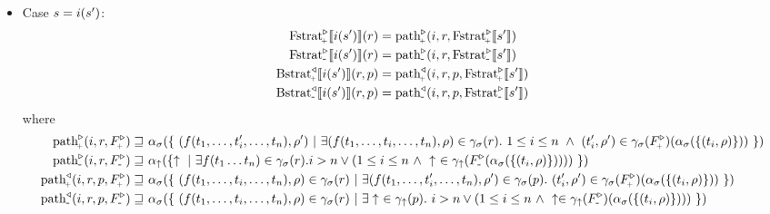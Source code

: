 \documentclass{article}
\newcommand{\minus}{{\scalebox{0.9}{-}}}
\newcommand{\plus}{{\scalebox{0.6}{\!+}}}
\newcommand{\fail}{\ensuremath \uparrow}
\newcommand{\path}[2]{\ensuremath #1(#2)}
\newcommand{\Fstratam}[1]{\ensuremath \text{Fstrat}^\triangleright_\minus \llbracket #1 \rrbracket}
\newcommand{\Fstratap}[1]{\ensuremath \text{Fstrat}^\triangleright_\plus \llbracket #1 \rrbracket}
\newcommand{\Bstratap}[1]{\ensuremath \text{Bstrat}_\plus^\triangleleft \llbracket #1 \rrbracket}
\newcommand{\Bstratam}[1]{\ensuremath \text{Bstrat}_\minus^\triangleleft \llbracket #1 \rrbracket}
\newcommand{\fpathp}{\ensuremath \text{path}^\triangleright_\plus}
\newcommand{\fpathm}{\ensuremath \text{path}^\triangleright_\minus}
\newcommand{\bpathp}{\ensuremath \text{path}^\triangleleft_\plus}
\newcommand{\bpathm}{\ensuremath \text{path}^\triangleleft_\minus}
\newcommand{\absstate}{\ensuremath \alpha_\sigma }
\newcommand{\constate}{\ensuremath \gamma_\sigma }
\newcommand{\absfail}{\ensuremath \alpha_\fail }
\newcommand{\confail}{\ensuremath \gamma_\fail }
\begin{document}
\begin{itemize}
\item Case $s = \path{i}{s'}$:
  \begin{align*}
    \Fstratap{\path{i}{s'}}(r) &= \fpathp(i,r,\Fstratap{s'}) \\
    \Fstratam{\path{i}{s'}}(r) &= \fpathm(i,r,\Fstratam{s'}) \\
    \Bstratap{\path{i}{s'}}(r,p) &= \bpathp(i,r,p,\Fstratap{s'}) \\
    \Bstratam{\path{i}{s'}}(r,p) &= \bpathm(i,r,p,\Fstratam{s'})
  \end{align*}
  where
  \begin{align*}
    \fpathp(i,r,F^\triangleright_\plus) \sqsupseteq\ &
       \absstate(\lbrace\
            (f(t_1,\ldots,t_i',\ldots,t_n),\rho')\ |\ 
            \exists (f(t_1,\ldots,t_i,\ldots,t_n),\rho) \in \constate(r). \ 
            1 \leq i \leq n\
            \land\ (t_i',\rho') \in \constate(F^\triangleright_\plus)(\absstate(\lbrace (t_i,\rho) \rbrace))\ \rbrace) \\
    \fpathm(i,r,F^\triangleright_\minus) \sqsupseteq\ & 
        \absfail(\lbrace \fail\ |\ \exists f(t_1\ldots t_n) \in \constate(r). i > n \lor (1 \leq i \leq n\ \land\ \fail\ \in \confail(F^\triangleright_\minus(\absstate(\lbrace (t_i,\rho) \rbrace))))\ \rbrace) \\
    \bpathp(i,r,p,F^\triangleright_\plus) \sqsupseteq\ &
       \absstate(\lbrace\ 
           (f(t_1,\ldots,t_i,\ldots,t_n),\rho) \in \constate(r)\ |\ 
             \exists (f(t_1,\ldots,t_i',\ldots,t_n),\rho') \in \constate(p).\ 
             (t_i',\rho') \in \constate(F^\triangleright_\plus)(\absstate(\lbrace (t_i,\rho) \rbrace))\ \rbrace) \\
    \bpathm(i,r,p,F^\triangleright_\minus) \sqsupseteq\ &
       \absstate(\lbrace\ 
           (f(t_1,\ldots,t_i,\ldots,t_n),\rho) \in \constate(r)\ |\ 
             \exists \fail\ \in \confail(p).\ 
             i > n \lor (1 \leq i \leq n\ \land\ \fail \in \confail(F^\triangleright_\minus)(\absstate(\lbrace (t_i,\rho) \rbrace)))\ \rbrace)
  \end{align*}


\end{itemize}
\end{document}
